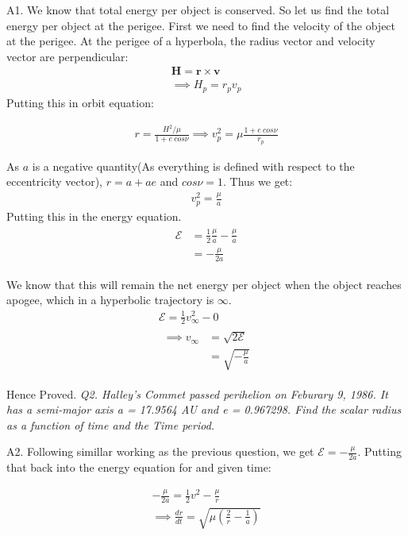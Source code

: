 \documentclass[12pt, letterpaper]{article}
\begin{document}
A1. We know that total energy per object is conserved. So let us find the total energy per object at the perigee. First we need to find the velocity of the object at the perigee. At the perigee of a hyperbola, the radius vector and velocity vector are perpendicular:
\begin{gather*}
	\mathbf{H} = \mathbf{r\times v}\\
	\implies H_p = r_pv_p
\end{gather*}
Putting this in orbit equation:

\begin{gather*}
	{r} = \frac{{H^2}/\mu}{1 + e\:cos\nu}
	\implies v_p^2 = \mu \frac{1 + e\:cos\nu}{r_p}
\end{gather*}

As $a$ is a negative quantity(As everything is defined with respect to the eccentricity vector), $r = a + ae$ and $cos\nu = 1$. Thus we get:
\begin{gather*}
	v_p^2 = \frac{\mu}{a}
\end{gather*}
Putting this in the energy equation.
\begin{gather*}
\begin{split}
	\mathcal{E} &= \frac{1}{2}\frac{\mu}{a} - \frac{\mu}{a}\\
	&= - \frac{\mu}{2a}
\end{split}
\end{gather*}

We know that this will remain the net energy per object when the object reaches apogee, which in a hyperbolic trajectory is $\infty$.
\begin{gather*}
	\mathcal{E} = \frac{1}{2}v_\infty^2 - 0\\
	\begin{split}
	\implies v_\infty &= \sqrt{2\mathcal{E}}\\
	&= \sqrt{-\frac{\mu}{a}}
	\end{split}
\end{gather*}

Hence Proved.
\newpage
\textit{Q2. Halley's Commet passed perihelion on Feburary 9, 1986. It has a semi-major axis a = 17.9564 AU and e = 0.967298. Find the scalar radius as a function of time and the Time period.}\newline

A2. Following simillar working as the previous question, we get $\mathcal{E} = -\frac{\mu}{2a} $. Putting that back into the energy equation for and given time:

\begin{gather*}
	-\frac{\mu}{2a} = \frac{1}{2}v^2 - \frac{\mu}{r}\\
	\implies \frac{dr}{dt} = \sqrt{\mu(\frac{2}{r}-\frac{1}{a})}
\end{gather*}
\end{document}
